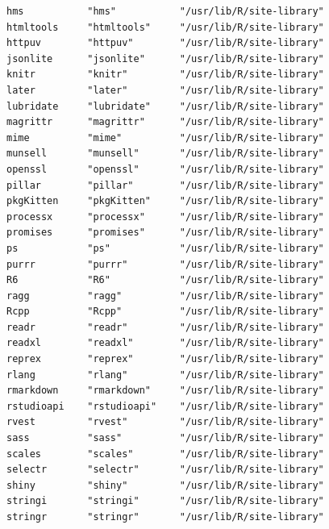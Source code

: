 \documentclass[
  letterpaper,
  DIV=11,
  numbers=noendperiod]{scrreprt}
\begin{document}
\begin{verbatim}
hms           "hms"           "/usr/lib/R/site-library"                       
htmltools     "htmltools"     "/usr/lib/R/site-library"                       
httpuv        "httpuv"        "/usr/lib/R/site-library"                       
jsonlite      "jsonlite"      "/usr/lib/R/site-library"                       
knitr         "knitr"         "/usr/lib/R/site-library"                       
later         "later"         "/usr/lib/R/site-library"                       
lubridate     "lubridate"     "/usr/lib/R/site-library"                       
magrittr      "magrittr"      "/usr/lib/R/site-library"                       
mime          "mime"          "/usr/lib/R/site-library"                       
munsell       "munsell"       "/usr/lib/R/site-library"                       
openssl       "openssl"       "/usr/lib/R/site-library"                       
pillar        "pillar"        "/usr/lib/R/site-library"                       
pkgKitten     "pkgKitten"     "/usr/lib/R/site-library"                       
processx      "processx"      "/usr/lib/R/site-library"                       
promises      "promises"      "/usr/lib/R/site-library"                       
ps            "ps"            "/usr/lib/R/site-library"                       
purrr         "purrr"         "/usr/lib/R/site-library"                       
R6            "R6"            "/usr/lib/R/site-library"                       
ragg          "ragg"          "/usr/lib/R/site-library"                       
Rcpp          "Rcpp"          "/usr/lib/R/site-library"                       
readr         "readr"         "/usr/lib/R/site-library"                       
readxl        "readxl"        "/usr/lib/R/site-library"                       
reprex        "reprex"        "/usr/lib/R/site-library"                       
rlang         "rlang"         "/usr/lib/R/site-library"                       
rmarkdown     "rmarkdown"     "/usr/lib/R/site-library"                       
rstudioapi    "rstudioapi"    "/usr/lib/R/site-library"                       
rvest         "rvest"         "/usr/lib/R/site-library"                       
sass          "sass"          "/usr/lib/R/site-library"                       
scales        "scales"        "/usr/lib/R/site-library"                       
selectr       "selectr"       "/usr/lib/R/site-library"                       
shiny         "shiny"         "/usr/lib/R/site-library"                       
stringi       "stringi"       "/usr/lib/R/site-library"                       
stringr       "stringr"       "/usr/lib/R/site-library"                       

\end{verbatim}
\end{document}
